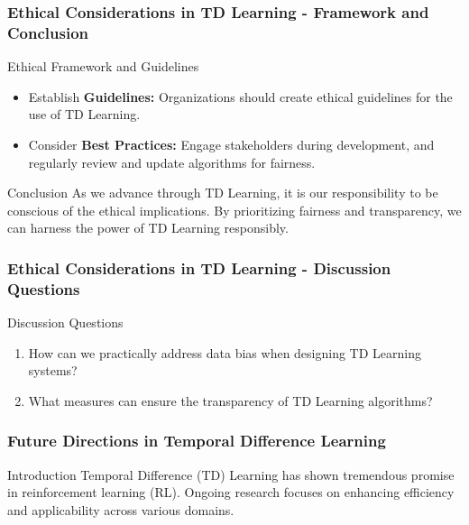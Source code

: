 \documentclass[aspectratio=169]{beamer}
\begin{document}
\begin{frame}[fragile]
    \frametitle{Ethical Considerations in TD Learning - Framework and Conclusion}
    \begin{block}{Ethical Framework and Guidelines}
        \begin{itemize}
            \item Establish \textbf{Guidelines:} Organizations should create ethical guidelines for the use of TD Learning.
            \item Consider \textbf{Best Practices:} Engage stakeholders during development, and regularly review and update algorithms for fairness.
        \end{itemize}
    \end{block}
    \begin{block}{Conclusion}
        As we advance through TD Learning, it is our responsibility to be conscious of the ethical implications. 
        By prioritizing fairness and transparency, we can harness the power of TD Learning responsibly.
    \end{block}
\end{frame}

\begin{frame}[fragile]
    \frametitle{Ethical Considerations in TD Learning - Discussion Questions}
    \begin{block}{Discussion Questions}
        \begin{enumerate}
            \item How can we practically address data bias when designing TD Learning systems?
            \item What measures can ensure the transparency of TD Learning algorithms?
        \end{enumerate}
    \end{block}
\end{frame}

\begin{frame}[fragile]
    \frametitle{Future Directions in Temporal Difference Learning}
    
    \begin{block}{Introduction}
        Temporal Difference (TD) Learning has shown tremendous promise in reinforcement learning (RL). Ongoing research focuses on enhancing efficiency and applicability across various domains.
    \end{block}
\end{frame}
\end{document}
